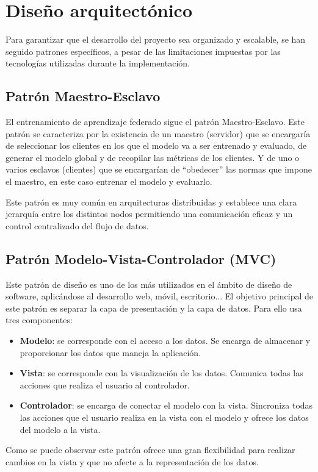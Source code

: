 
\section{Diseño arquitectónico}
\label{sec:DisenoArquitectonico}
Para garantizar que el desarrollo del proyecto sea organizado y escalable, se han seguido patrones específicos, a pesar de las limitaciones impuestas por las tecnologías utilizadas durante la implementación.

\subsection{Patrón Maestro-Esclavo}
\label{subsec:PatronMaestroEsclavo}
El entrenamiento de aprendizaje federado sigue el patrón Maestro-Esclavo. Este patrón se caracteriza por la existencia de un maestro (servidor) que se encargaría de seleccionar los clientes en los que el modelo va a ser entrenado y evaluado, de generar el modelo global y de recopilar las métricas de los clientes. Y de uno o varios esclavos (clientes) que se encargarían de ``obedecer'' las normas que impone el maestro, en este caso entrenar el modelo y evaluarlo.

Este patrón es muy común en arquitecturas distribuidas y establece una clara jerarquía entre los distintos nodos permitiendo una comunicación eficaz y un control centralizado del flujo de datos.

\subsection{Patrón Modelo-Vista-Controlador (MVC)}
\label{subsec:PatronModeloVistaControlador}
Este patrón de diseño es uno de los más utilizados en el ámbito de diseño de software, aplicándose al desarrollo web, móvil, escritorio... El objetivo principal de este patrón es separar la capa de presentación y la capa de datos. Para ello usa tres componentes:
\begin{itemize}
    \item \textbf{Modelo}: se corresponde con el acceso a los datos. Se encarga de almacenar y proporcionar los datos que maneja la aplicación.
    \item \textbf{Vista}: se corresponde con la visualización de los datos. Comunica todas las acciones que realiza el usuario al controlador.
    \item \textbf{Controlador}: se encarga de conectar el modelo con la vista. Sincroniza todas las acciones que el usuario realiza en la vista con el modelo y ofrece los datos del modelo a la vista.
\end{itemize}
Como se puede observar este patrón ofrece una gran flexibilidad para realizar cambios en la vista y que no afecte a la representación de los datos.

